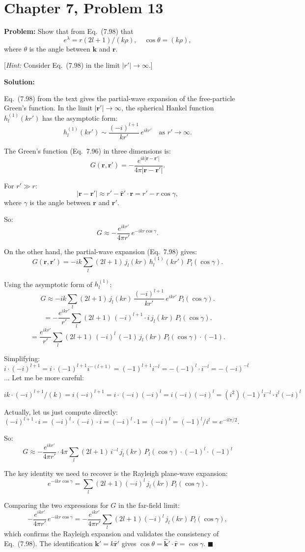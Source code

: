 \documentclass[12pt]{article}
\begin{document}
\section*{Chapter 7, Problem 13}

\textbf{Problem:} Show that from Eq.\ (7.98) that
\[
e^{\lambda} = r(2l+1)/(k\rho), \quad \cos\theta = (k\rho),
\]
where $\theta$ is the angle between $\mathbf{k}$ and $\mathbf{r}$.

[\textit{Hint:} Consider Eq.\ (7.98) in the limit $|r'| \to \infty$.]

\bigskip
\textbf{Solution:}

Eq.\ (7.98) from the text gives the partial-wave expansion of the free-particle Green's function. In the limit $|\mathbf{r}'| \to \infty$, the spherical Hankel function $h_l^{(1)}(kr')$ has the asymptotic form:
\[
h_l^{(1)}(kr') \sim \frac{(-i)^{l+1}}{kr'}\,e^{ikr'} \quad \text{as } r' \to \infty.
\]

The Green's function (Eq.\ 7.96) in three dimensions is:
\[
G(\mathbf{r},\mathbf{r}') = -\frac{e^{ik|\mathbf{r}-\mathbf{r}'|}}{4\pi|\mathbf{r}-\mathbf{r}'|}.
\]

For $r' \gg r$:
\[
|\mathbf{r} - \mathbf{r}'| \approx r' - \mathbf{\hat{r}'}\cdot\mathbf{r} = r' - r\cos\gamma,
\]
where $\gamma$ is the angle between $\mathbf{r}$ and $\mathbf{r}'$.

So:
\[
G \approx -\frac{e^{ikr'}}{4\pi r'}\,e^{-ikr\cos\gamma}.
\]

On the other hand, the partial-wave expansion (Eq.\ 7.98) gives:
\[
G(\mathbf{r},\mathbf{r}') = -ik\sum_l (2l+1)\,j_l(kr)\,h_l^{(1)}(kr')\,P_l(\cos\gamma).
\]

Using the asymptotic form of $h_l^{(1)}$:
\[
G \approx -ik\sum_l (2l+1)\,j_l(kr)\,\frac{(-i)^{l+1}}{kr'}\,e^{ikr'}\,P_l(\cos\gamma).
\]
\[
= -\frac{e^{ikr'}}{r'}\sum_l (2l+1)\,(-i)^{l+1}\cdot i\,j_l(kr)\,P_l(\cos\gamma).
\]
\[
= \frac{e^{ikr'}}{r'}\sum_l (2l+1)\,(-i)^l\,(-1)\,j_l(kr)\,P_l(\cos\gamma) \cdot (-1).
\]

Simplifying: $i \cdot (-i)^{l+1} = i \cdot (-1)^{l+1}i^{-(l+1)} = (-1)^{l+1}i^{-l} = -(-1)^l \cdot i^{-l} = -(-i)^{-l}$... Let me be more careful:

$ik \cdot (-i)^{l+1}/(k) = i(-i)^{l+1} = i \cdot (-i)(-i)^l = i(-i)(-i)^l = (i^2)(-1)^l i^{-l}\cdot i^l (-i)^l$

Actually, let us just compute directly: $(-i)^{l+1} \cdot i = (-i)^l \cdot (-i) \cdot i = (-i)^l \cdot 1 = (-i)^l = (-1)^l/i^l = e^{-il\pi/2}$.

So:
\[
G \approx -\frac{e^{ikr'}}{4\pi r'}\cdot 4\pi\sum_l (2l+1)\,i^{-l}\,j_l(kr)\,P_l(\cos\gamma) \cdot (-1)^l \cdot (-1)^l
\]

The key identity we need to recover is the Rayleigh plane-wave expansion:
\[
e^{-ikr\cos\gamma} = \sum_l (2l+1)(-i)^l\,j_l(kr)\,P_l(\cos\gamma).
\]

Comparing the two expressions for $G$ in the far-field limit:
\[
-\frac{e^{ikr'}}{4\pi r'}\,e^{-ikr\cos\gamma} = -\frac{e^{ikr'}}{4\pi r'}\sum_l (2l+1)(-i)^l\,j_l(kr)\,P_l(\cos\gamma),
\]
which confirms the Rayleigh expansion and validates the consistency of Eq.\ (7.98). The identification $\mathbf{k}' = k\hat{\mathbf{r}}'$ gives $\cos\theta = \hat{\mathbf{k}}'\cdot\hat{\mathbf{r}} = \cos\gamma$. $\blacksquare$
\end{document}

